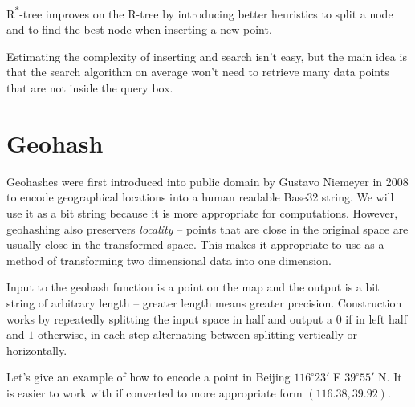 \documentclass[times, utf8, diplomski]{fer}
\newcommand{\rstar}{R\textsuperscript{*}}
\begin{document}
\rstar-tree improves on the R-tree by introducing better heuristics to split a node and to find the best node when inserting a new point.

Estimating the complexity of inserting and search isn't easy, but the main idea is that the search algorithm on average won't need to retrieve many data points that are not inside the query box. 

\section{Geohash} \label{geohashing}
Geohashes were first introduced into public domain by Gustavo Niemeyer in 2008 \cite{spatiotemporal} to encode geographical locations into a human readable Base32 string. We will use it as a bit string because it is more appropriate for computations. However, geohashing also preservers \emph{locality} -- points that are close in the original space are usually close in the transformed space. This makes it appropriate to use as a method of transforming two dimensional data into one dimension.

Input to the geohash function is a point on the map and the output is a bit string of arbitrary length -- greater length means greater precision. Construction works by repeatedly splitting the input space in half and output a $0$ if in left half and $1$ otherwise, in each step alternating between splitting vertically or horizontally.

Let's give an example of how to encode a point in Beijing $116^{\circ}23'$ E $39^{\circ}55'$ N. It is easier to work with if converted to more appropriate form $(116.38, 39.92)$. 
\end{document}
